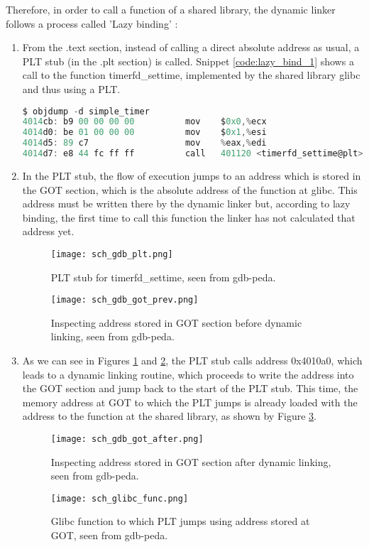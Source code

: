 Therefore, in order to call a function of a shared library, the dynamic linker follows a process called 'Lazy binding' \cite{plt_got_technovelty}:
\begin{enumerate}
\item From the .text section, instead of calling a direct absolute address as usual, a PLT stub (in the .plt section) is called. Snippet \ref{code:lazy_bind_1} shows a call to the function timerfd\_settime, implemented by the shared library glibc and thus using a PLT.
\begin{lstlisting}[language=C, caption={Call to PLT stub seen from objdump.}, label={code:lazy_bind_1}]
$ objdump -d simple_timer
4014cb:	b9 00 00 00 00       	mov    $0x0,%ecx
4014d0:	be 01 00 00 00       	mov    $0x1,%esi
4014d5:	89 c7                	mov    %eax,%edi
4014d7:	e8 44 fc ff ff       	call   401120 <timerfd_settime@plt>
\end{lstlisting}

\item In the PLT stub, the flow of execution jumps to an address which is stored in the GOT section, which is the absolute address of the function at glibc. This address must be written there by the dynamic linker but, according to lazy binding, the first time to call this function the linker has not calculated that address yet. 

\begin{figure}[htbp]
	\centering
	\texttt{[image: sch\_gdb\_plt.png]}
	\caption{PLT stub for timerfd\_settime, seen from gdb-peda.}
	\label{fig:lazy_bind_2}
\end{figure}

\begin{figure}[htbp]
	\centering
	\texttt{[image: sch\_gdb\_got\_prev.png]}
	\caption{Inspecting address stored in GOT section before dynamic linking, seen from gdb-peda.}
	\label{fig:lazy_bind_3}
\end{figure}

\item As we can see in Figures \ref{fig:lazy_bind_2} and \ref{fig:lazy_bind_3}, the PLT stub calls address 0x4010a0, which leads to a dynamic linking routine, which proceeds to write the address into the GOT section and jump back to the start of the PLT stub. This time, the memory address at GOT to which the PLT jumps is already loaded with the address to the function at the shared library, as shown by Figure \ref{fig:lazy_bind_4}.

\begin{figure}[htbp]
	\centering
	\texttt{[image: sch\_gdb\_got\_after.png]}
	\caption{Inspecting address stored in GOT section after dynamic linking, seen from gdb-peda.}
	\label{fig:lazy_bind_4}
\end{figure}

\begin{figure}[htbp]
	\centering
	\texttt{[image: sch\_glibc\_func.png]}
	\caption{Glibc function to which PLT jumps using address stored at GOT, seen from gdb-peda.}
	\label{fig:lazy_bind_5}
\end{figure}

\end{enumerate}

